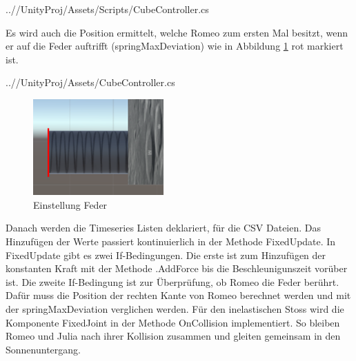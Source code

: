 \documentclass[../main.tex]{subfiles}
\begin{document}
    \begin{lstinputlisting}[label={lst:graphInelastic}, firstline=49, lastline=50]
    {..//UnityProj/Assets/Scripts/CubeController.cs}
    \end{lstinputlisting}
    Es wird auch die Position ermittelt, welche Romeo zum ersten Mal besitzt, wenn er auf die Feder auftrifft (springMaxDeviation) wie in Abbildung \ref{fig:2Lab_SpringDeviation} rot markiert ist.
    \begin{lstinputlisting}[label={lst:graphInelastic}, firstline=51, lastline=52]
    {..//UnityProj/Assets/CubeController.cs}
    \end{lstinputlisting}


    \begin{figure}[H]
        \begin{center}
            \centerline{\includegraphics[width=50mm]{./images/2Lab_SpringDeviation.PNG}}
            \caption{Einstellung Feder}
            \label{fig:2Lab_SpringDeviation}
        \end{center}
    \end{figure}
    Danach werden die Timeseries Listen deklariert, für die CSV Dateien. Das Hinzufügen der Werte passiert kontinuierlich in der Methode FixedUpdate.
    \newline
    In FixedUpdate gibt es zwei If-Bedingungen. Die erste ist zum Hinzufügen der konstanten Kraft mit der Methode .AddForce bis die Beschleunigunszeit vorüber ist.
    Die zweite If-Bedingung ist zur Überprüfung, ob Romeo die Feder berührt. Dafür muss die Position der rechten Kante von Romeo berechnet werden und mit der
    springMaxDeviation verglichen werden.
    Für den inelastischen Stoss wird die Komponente FixedJoint in der Methode OnCollision implementiert. So bleiben Romeo und Julia  nach ihrer
    Kollision zusammen und gleiten gemeinsam in den Sonnenuntergang.
\end{document}
